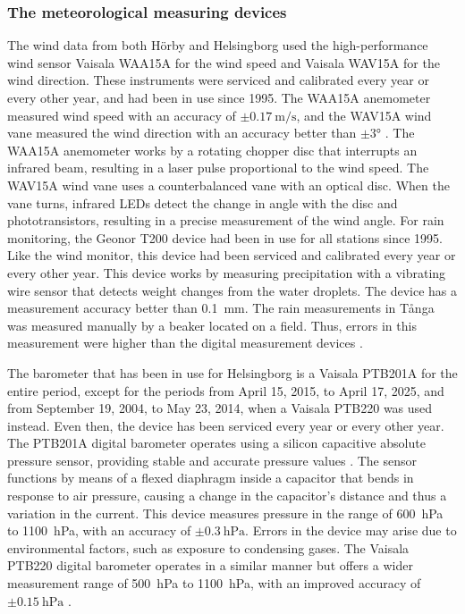 \subsubsection{The meteorological measuring devices}
The wind data from both Hörby and Helsingborg used the high-performance wind sensor Vaisala WAA15A for the wind speed and Vaisala WAV15A for the wind direction. These instruments were serviced and calibrated every year or every other year, and had been in use since 1995. The WAA15A anemometer measured wind speed with an accuracy of $\pm\SI{0.17}{\m\per\s}$, and the WAV15A wind vane measured the wind direction with an accuracy better than $\pm\ang{3}$ \cite{vaisalaWindSetWA152021}. The WAA15A anemometer works by a rotating chopper disc that interrupts an infrared beam, resulting in a laser pulse proportional to the wind speed. The WAV15A wind vane uses a counterbalanced vane with an optical disc. When the vane turns, infrared LEDs detect the change in angle with the disc and phototransistors, resulting in a precise measurement of the wind angle. For rain monitoring, the Geonor T200 device had been in use for all stations since 1995. Like the wind monitor, this device had been serviced and calibrated every year or every other year. This device works by measuring precipitation with a vibrating wire sensor that detects weight changes from the water droplets\cite{geonorinc.T200BSeriesAll2019}. The device has a measurement accuracy better than \SI{0.1}{\mm}. The rain measurements in Tånga was measured manually by a beaker located on a field. Thus, errors in this measurement were higher than the digital measurement devices . 

The barometer that has been in use for Helsingborg is a Vaisala PTB201A for the entire period, except for the periods from April 15, 2015, to April 17, 2025, and from September 19, 2004, to May 23, 2014, when a Vaisala PTB220 was used instead. Even then, the device has been serviced every year or every other year. The PTB201A digital barometer operates using a silicon capacitive absolute pressure sensor, providing stable and accurate pressure values \cite{vaisalaPTB200DIGITAL1993}. The sensor functions by means of a flexed diaphragm inside a capacitor that bends in response to air pressure, causing a change in the capacitor’s distance and thus a variation in the current. This device measures pressure in the range of \SI{600}{\hecto\pascal} to \SI{1100}{\hecto\pascal}, with an accuracy of $\pm\SI{0.3}{\hecto\pascal}$. Errors in the device may arise due to environmental factors, such as exposure to condensing gases. The Vaisala PTB220 digital barometer operates in a similar manner but offers a wider measurement range of \SI{500}{\hecto\pascal} to \SI{1100}{\hecto\pascal}, with an improved accuracy of $\pm\SI{0.15}{\hecto\pascal}$ \cite{vaisalaPTB220SeriesDigital2001}.


